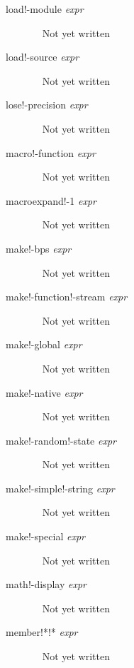 \documentclass[a4paper,11pt]{article}
\begin{document}
\begin{description}
\item [{\ttfamily load!-module} {\itshape  expr}] ~\newline
Not yet written

\item [{\ttfamily load!-source} {\itshape  expr}] ~\newline
Not yet written

\item [{\ttfamily lose!-precision} {\itshape  expr}] ~\newline
Not yet written

\item [{\ttfamily macro!-function} {\itshape  expr}] ~\newline
Not yet written

\item [{\ttfamily macroexpand!-1} {\itshape  expr}] ~\newline
Not yet written

\item [{\ttfamily make!-bps} {\itshape  expr}] ~\newline
Not yet written

\item [{\ttfamily make!-function!-stream} {\itshape  expr}] ~\newline
Not yet written

\item [{\ttfamily make!-global} {\itshape  expr}] ~\newline
Not yet written

\item [{\ttfamily make!-native} {\itshape  expr}] ~\newline
Not yet written

\item [{\ttfamily make!-random!-state} {\itshape  expr}] ~\newline
Not yet written

\item [{\ttfamily make!-simple!-string} {\itshape  expr}] ~\newline
Not yet written

\item [{\ttfamily make!-special} {\itshape  expr}] ~\newline
Not yet written

\item [{\ttfamily math!-display} {\itshape  expr}] ~\newline
Not yet written

\item [{\ttfamily member!*!*} {\itshape  expr}] ~\newline
Not yet written


\end{description}
\end{document}

